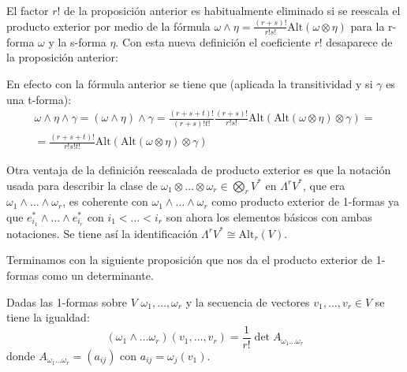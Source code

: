 \documentclass[../VD.tex]{subfiles}
\begin{document}
\begin{remark}\label{rem:reescalado}
  El factor \(r!\) de la proposición anterior es habitualmente eliminado si se
  reescala el producto exterior por medio de la fórmula
  \(\omega\wedge\eta=\frac{(r+s)!}{r!s!}\text{Alt}(\omega\otimes\eta)\) para la
  r-forma \(\omega\) y la s-forma \(\eta\). Con esta nueva definición el
  coeficiente \(r!\) desaparece de la proposición anterior:

  En efecto con la fórmula anterior se tiene que (aplicada la transitividad y si
  \(\gamma\) es una t-forma): 
  \[\begin{array}{c}
      \omega\wedge\eta\wedge\gamma=(\omega\wedge\eta)\wedge\gamma=
      \frac{(r+s+t)!}{(r+s)!t!}\frac{(r+s)!}{r!s!}\text{Alt}
      (\text{Alt}(\omega\otimes\eta)\otimes\gamma)= \\
      =\frac{(r+s+t)!}{r!s!t!}\text{Alt}(\text{Alt}(\omega\otimes\eta)\otimes\gamma)
    \end{array}\]
\end{remark}

\begin{remark}
  Otra ventaja de la definición reescalada de producto exterior es que la
  notación usada para describir la clase de
  \(\omega_{1}\otimes\dots\otimes\omega_{r}\in\bigotimes_{r}V^{*}\) en
  \(\Lambda^{r}V^{*}\), que era \(\omega_{1}\wedge\dots\wedge\omega_{r}\), es
  coherente con \(\omega_{1}\wedge\dots\wedge\omega_{r}\) como producto exterior
  de 1-formas ya que \(e_{i_{1}}^{*}\wedge\dots\wedge e_{i_{r}}^{*}\) con
  \(i_{1}<\dots<i_{r}\) son ahora los elementos básicos con ambas notaciones. Se
  tiene así la identificación \(\Lambda^{r}V^{*}\cong\text{Alt}_{r}(V)\). 
\end{remark}

Terminamos con la siguiente proposición que nos da el producto exterior de
1-formas como un determinante.

\begin{proposition}\label{prop:prod-ext-det}
  Dadas las 1-formas sobre \(V\) \(\omega_{1},\dots,\omega_{r}\) y la secuencia
  de vectores \(v_{1},\dots,v_{r}\in V\) se tiene la igualdad:
  \[
    (\omega_{1}\wedge\dots\omega_{r})(v_{1},\dots,v_{r})=
    \frac{1}{r!}\det{A_{\omega_{1}\dots\omega_{r}}}
  \]
  donde \(A_{\omega_{1}\dots\omega_{r}}=(a_{ij})\) con \(a_{ij}=\omega_{j}(v_{1})\).
\end{proposition}
\end{document}
